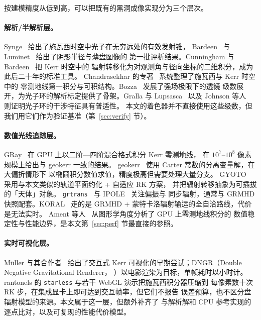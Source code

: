 按建模精度从低到高，可以把既有的黑洞成像实现分为三个层次。

\paragraph{解析/半解析层。}
Synge~\cite{synge1966} 给出了施瓦西时空中光子在无穷远处的有效发射锥，
Bardeen~\cite{bardeen1973} 与 Luminet~\cite{luminet1979} 给出了阴影半径与薄盘图像的
第一批评析结果。Cunningham 与 Bardeen~\cite{cunningham1973} 把 Kerr 时空中的
辐射转移化为对观测角与径向坐标的二维积分，成为此后二十年的标准工具。
Chandrasekhar 的专著~\cite{chandrasekhar1983} 系统整理了施瓦西与 Kerr 时空中的
零测地线第一积分与可积结构。Bozza~\cite{bozza2002} 发展了强场极限下的透镜
级数展开，为光子环的解析标定提供了骨架。Gralla 与 Lupsasca~\cite{gralla2020}
以及 Johnson 等人~\cite{johnson2020} 则证明光子环的干涉特征具有普适性。
本文的着色器并不直接使用这些级数，但我们用它们作为验证基准（第~\ref{sec:verify} 节）。

\paragraph{数值光线追踪层。}
GRay~\cite{gray2013} 在 GPU 上以二阶—四阶混合格式积分 Kerr 零测地线，
在 $10^{7}$--$10^{8}$ 像素规模上给出与 geokerr 一致的结果。
geokerr~\cite{dexter2009} 使用 Carter 常数的分离变量解，在大偏折情形下
以椭圆积分数值求值，精度极高但需要处理大量分支。
GYOTO~\cite{gyoto2011} 采用与本文类似的轨道平面约化 + 自适应 RK 方案，
并把辐射转移抽象为可插拔的「天体」对象。
\texttt{grtrans}~\cite{grtrans2016} 与 IPOLE~\cite{ipole2016} 关注偏振与
同步辐射，通常与 GRMHD 快照配套。KORAL~\cite{koral2013} 走的是
GRMHD + 蒙特卡洛辐射输运的全自洽路线，代价是无法实时。
Ament 等人~\cite{ament2015} 从图形学角度分析了 GPU 上零测地线积分的
数值稳定性与性能边界，是本文第~\ref{sec:perf} 节最直接的参照。

\paragraph{实时可视化层。}
Müller 与其合作者~\cite{muller2010,muller2014} 给出了交互式 Kerr
可视化的早期尝试；DNGR（Double Negative Gravitational Renderer，
\cite{james2015}）以电影渲染为目标，单帧耗时以小时计。
rantonels 的 \texttt{starless} 与若干 WebGL 演示把施瓦西积分器压缩到
每像素数十次 RK 步，在集成显卡上即可达到交互帧率，但它们不报告
误差预算，也不区分盘辐射模型的来源。本文属于这一层，但额外补齐了
与解析解和 CPU 参考实现的逐点比对，以及可复现的性能代价模型。

